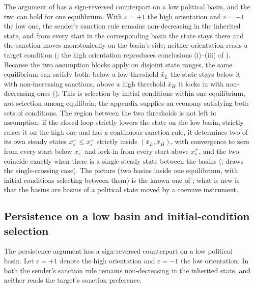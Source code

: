 The argument of  has a sign-reversed counterpart on a low
political basin, and the two can hold for one equilibrium. With
$\varepsilon=+1$ the high orientation and $\varepsilon=-1$ the low one, the
sender's sanction rule remains non-decreasing in the inherited state, and from
every start in the corresponding basin the state stays there and the
sanction moves monotonically on the basin's side; neither orientation reads
a target condition (; the high
orientation reproduces conclusions (i)--(iii) of ).
Because the two assumption blocks apply on disjoint state ranges, the same
equilibrium can satisfy both: below a low threshold $\bar x_L$ the state
stays below it with non-increasing sanctions, above a high threshold $\bar x_H$ it
locks in with non-decreasing ones
(). This is selection by initial
conditions within one equilibrium, not selection among equilibria; the
appendix supplies an economy satisfying both sets of conditions. The region
between the two thresholds is not left to assumption: if the closed loop
strictly lowers the state on the low basin, strictly raises it on the high
one and has a continuous sanction rule, it determines two of its own steady
states $x_s^-\le x_s^+$ strictly inside $(\bar x_L,\bar x_H)$, with convergence to zero
from every start below $x_s^-$ and lock-in from every start above $x_s^+$,
and the two coincide exactly when there is a single steady state between the
basins (; 
draws the single-crossing case). The picture (two
basins inside one equilibrium, with initial conditions selecting between
them) is the known one of ; what is new is that the
basins are basins of a political state moved by a coercive instrument.

\subsection{Persistence on a low basin and initial-condition selection}

The persistence argument has a sign-reversed counterpart on a low
political basin. Let $\varepsilon=+1$ denote the high orientation and
$\varepsilon=-1$ the low orientation. In both the sender's sanction rule remains
non-decreasing in the inherited state, and neither reads the target's
sanction preference.

